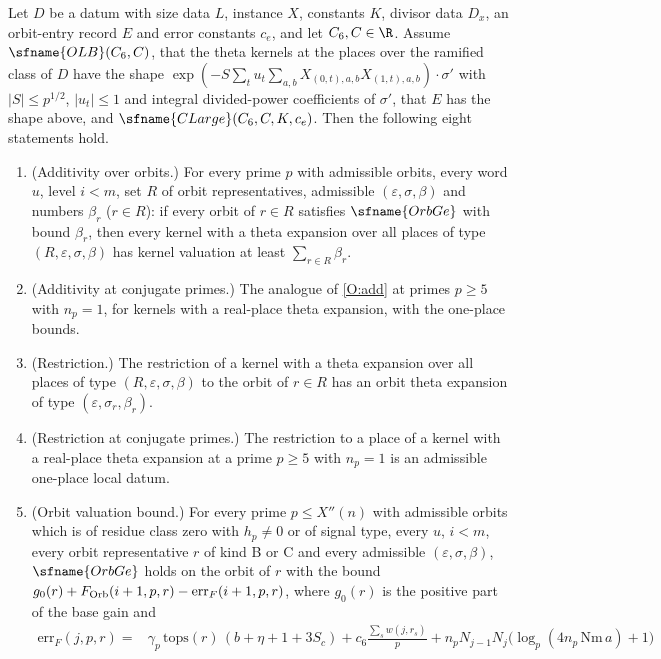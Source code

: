 \begin{theorem}\label{pf:top-shape:orbit}
Let $D$ be a datum with size data $L$, instance $X$, constants $K$, divisor data $D_x$, an orbit-entry record $E$ and
error constants $c_e$, and let $C_6,C\in\R$. Assume $\sfname{OLB}(C_6,C)$, that the theta kernels at the places over
the ramified class of $D$ have the shape $\exp(-S\sum_tu_t\sum_{a,b}X_{(0,t),a,b}X_{(1,t),a,b})\cdot\sigma'$ with $|S|\le
p^{1/2}$, $|u_t|\le1$ and integral divided-power coefficients of $\sigma'$, that $E$ has the shape above, and
$\sfname{CLarge}(C_6,C,K,c_e)$. Then the following eight statements hold.
\begin{enumerate}[label=(O\arabic*)]
\item\label{O:add} (Additivity over orbits.) For every prime $p$ with admissible orbits, every word $u$, level $i<m$,
set $R$ of orbit representatives, admissible $(\varepsilon,\sigma,\beta)$ and numbers $\beta_r$ ($r\in R$): if every
orbit of $r\in R$ satisfies $\sfname{OrbGe}$ with bound $\beta_r$, then every kernel with a theta expansion over all
places of type $(R,\varepsilon,\sigma,\beta)$ has kernel valuation at least $\sum_{r\in R}\beta_r$.
\item (Additivity at conjugate primes.) The analogue of \ref{O:add} at primes $p\ge5$ with $n_p=1$, for kernels with a
real-place theta expansion, with the one-place bounds.
\item (Restriction.) The restriction of a kernel with a theta expansion over all places of type $(R,\varepsilon,\sigma,
\beta)$ to the orbit of $r\in R$ has an orbit theta expansion of type $(\varepsilon,\sigma_r,\beta_r)$.
\item (Restriction at conjugate primes.) The restriction to a place of a kernel with a real-place theta expansion at
a prime $p\ge5$ with $n_p=1$ is an admissible one-place local datum.
\item\label{O:val} (Orbit valuation bound.) For every prime $p\le X''(n)$ with admissible orbits which is of residue
class zero with $h_p\ne0$ or of signal type, every $u$, $i<m$, every orbit representative $r$ of kind B or C and every
admissible $(\varepsilon,\sigma,\beta)$, $\sfname{OrbGe}$ holds on the orbit of $r$ with the bound
$g_0(r)+F_{\rm Orb}(i+1,p,r)-\mathrm{err}_F(i+1,p,r)$, where $g_0(r)$ is the positive part of the base gain and
\begin{align*}
\mathrm{err}_F(j,p,r)={}&\gamma_p\,\mathrm{tops}(r)\,(b+\eta+1+3S_c)+c_6\frac{\sum_sw(j,r_s)}p
+n_pN_{j-1}N_j\bigl(\log_p(4n_p\,\mathrm{Nm}\,a)+1\bigr)\\

\end{align*}
\end{enumerate}
\end{theorem}
